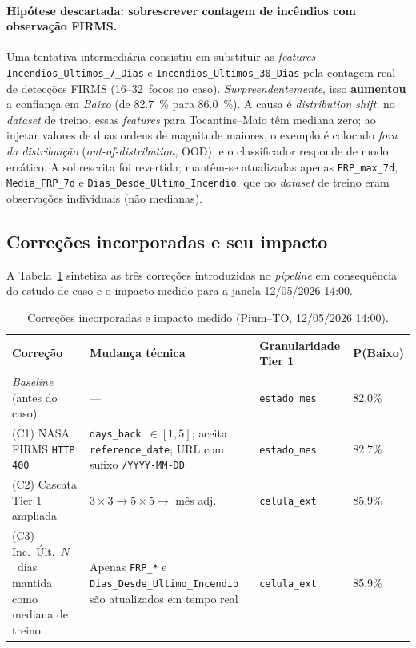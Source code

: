 \paragraph{Hipótese descartada: sobrescrever contagem de incêndios com observação FIRMS.}

Uma tentativa intermediária consistiu em substituir as \emph{features} \texttt{Incendios\_Ultimos\_7\_Dias} e \texttt{Incendios\_Ultimos\_30\_Dias} pela contagem real de detecções FIRMS (16--32~focos no caso). \emph{Surpreendentemente}, isso \textbf{aumentou} a confiança em \emph{Baixo} (de \SI{82,7}{\percent} para \SI{86,0}{\percent}). A causa é \emph{distribution shift}: no \emph{dataset} de treino, essas \emph{features} para Tocantins--Maio têm mediana zero; ao injetar valores de duas ordens de magnitude maiores, o exemplo é colocado \emph{fora da distribuição} (\emph{out-of-distribution}, OOD), e o classificador responde de modo errático. A sobrescrita foi revertida; mantêm-se atualizadas apenas \texttt{FRP\_max\_7d}, \texttt{Media\_FRP\_7d} e \texttt{Dias\_Desde\_Ultimo\_Incendio}, que no \emph{dataset} de treino eram observações individuais (não medianas).

\subsection{Correções incorporadas e seu impacto}
\label{subsec:pium_correcoes}

A Tabela~\ref{tab:pium_correcoes} sintetiza as três correções introduzidas no \emph{pipeline} em consequência do estudo de caso e o impacto medido para a janela 12/05/2026 14:00.

\begin{table}[h]
\centering
\caption{Correções incorporadas e impacto medido (Pium--TO, 12/05/2026 14:00).}
\label{tab:pium_correcoes}
\small
\begin{tabular}{p{4.6cm}p{5.2cm}p{2.4cm}p{1.6cm}}
\toprule
\textbf{Correção} & \textbf{Mudança técnica} & \textbf{Granularidade Tier 1} & \textbf{P(Baixo)} \\
\midrule
\emph{Baseline} (antes do caso) & --- & \texttt{estado\_mes} & 82,0\% \\
(C1) NASA FIRMS \texttt{HTTP 400} & \texttt{days\_back $\in [1,5]$}; aceita \texttt{reference\_date}; URL com sufixo \texttt{/YYYY-MM-DD} & \texttt{estado\_mes} & 82,7\% \\
(C2) Cascata Tier 1 ampliada & $3{\times}3 \to 5{\times}5 \to$ mês adj. & \texttt{celula\_ext} & 85,9\% \\
(C3) Inc.~Últ.~$N$~dias mantida como mediana de treino & Apenas \texttt{FRP\_*} e \texttt{Dias\_Desde\_Ultimo\_Incendio} são atualizados em tempo real & \texttt{celula\_ext} & 85,9\% \\
\bottomrule
\end{tabular}
\end{table}

